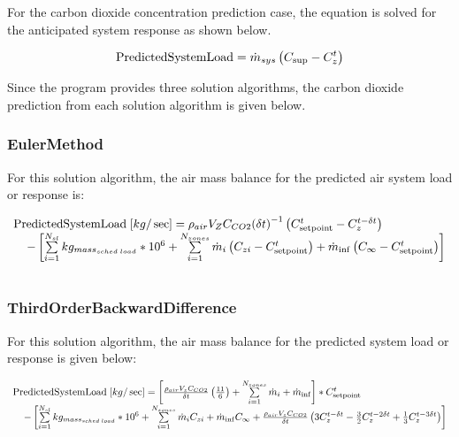 For the carbon dioxide concentration prediction case, the equation is solved for the anticipated system response as shown below.

\begin{equation}
{\rm{PredictedSystemLoad}} = {\dot m_{sys}}\left( {{C_{\sup }} - C_z^t} \right)
\end{equation}

Since the program provides three solution algorithms, the carbon dioxide prediction from each solution algorithm is given below.

\subsubsection{EulerMethod}\label{eulermethod}

For this solution algorithm, the air mass balance for the predicted air system load or response is:

\begin{equation}
\begin{array}{l}{\rm{PredictedSystemLoad}}\;[kg/\sec ] = {\rho_{air}}{V_Z}{C_{CO2}}{\left( {\delta t} \right)^{ - 1}}\left( {C_{{\rm{setpoint}}}^t - C_z^{t - \delta t}} \right)\\\;\;\;\; - \left[ {\sum\limits_{i = 1}^{{N_{sl}}} {k{g_{mas{s_{sched\;load}}}}} *{{10}^6} + \sum\limits_{i = 1}^{{N_{zones}}} {{{\dot m}_i}} \left( {{C_{zi}} - C_{{\rm{setpoint}}}^t} \right) + {{\dot m}_{\inf }}\left( {{C_\infty } - C_{{\rm{setpoint}}}^t} \right)} \right]\\\;\;\;\;\;\;\;\;\;\;\;\;\;\;\;\;\;\;\;\;\;\;\;\;\;\;\;\;\;\;\;\;\;\;\;\end{array}
\end{equation}

\subsubsection{ThirdOrderBackwardDifference}\label{thirdorderbackwarddifference}

For this solution algorithm, the air mass balance for the predicted system load or response is given below:

\begin{equation}
\begin{array}{l}{\rm{PredictedSystemLoad}}\;[kg/\sec ] = \left[ {\frac{{{\rho_{air}}{V_z}{C_{CO2}}}}{{\delta t}}\left( {\frac{{11}}{6}} \right) + \sum\limits_{i = 1}^{{N_{zones}}} {{{\dot m}_i}}  + {{\dot m}_{\inf }}} \right]*C_{{\rm{setpoint}}}^t\\\;\;\;\; - \left[ {\sum\limits_{i = 1}^{{N_{sl}}} {k{g_{mas{s_{sched\;load}}}}*{{10}^6}}  + \sum\limits_{i = 1}^{{N_{zones}}} {{{\dot m}_i}} {C_{zi}} + {{\dot m}_{\inf }}{C_\infty } + \frac{{{\rho_{air}}{V_z}{C_{CO2}}}}{{\delta t}}\left( {3C_z^{t - \delta t} - \frac{3}{2}C_z^{t - 2\delta t} + \frac{1}{3}C_z^{t - 3\delta t}} \right)} \right]\\\;\;\;\;\;\;\;\;\;\;\;\;\;\;\;\;\;\;\;\;\;\;\;\;\;\;\;\;\;\;\;\;\;\;\;\end{array}
\end{equation}

